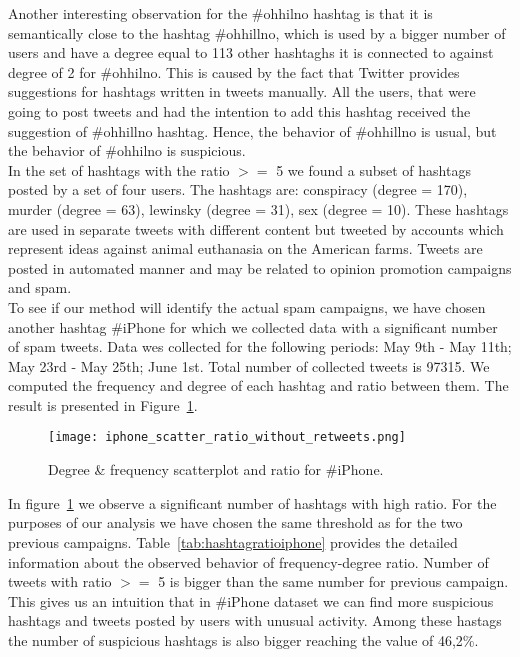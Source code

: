 \documentclass[journal, a4paper, 12pt]{article}
\begin{document}
Another interesting observation for the \#ohhilno hashtag is that it is semantically close to the hashtag \#ohhillno, which is used by a bigger number of users and have a degree equal to 113 other hashtaghs it is connected to against degree of 2 for \#ohhilno. This is caused by the fact that Twitter provides suggestions for hashtags written in tweets manually. All the users, that were going to post tweets and had the intention to add this hashtag received the suggestion of \#ohhillno hashtag. Hence, the behavior of \#ohhillno is usual, but the behavior of \#ohhilno is suspicious. \\

In the set of hashtags with the ratio $>=$ 5 we found a subset of hashtags posted by a set of four users. The hashtags are: conspiracy (degree = 170), murder (degree = 63), lewinsky (degree = 31), sex (degree = 10). These hashtags are used in separate tweets with different content but tweeted by accounts which represent ideas against animal euthanasia on the American farms. Tweets are posted in automated manner and may be related to opinion promotion campaigns and spam. \\


To see if our method will identify the actual spam campaigns, we have chosen another hashtag \#iPhone for which we collected data with a significant number of spam tweets. Data wes collected for the following periods: May 9th - May 11th; May 23rd - May 25th; June 1st. Total number of collected tweets is 97315. We computed the frequency and degree of each hashtag and ratio between them. The result is presented in Figure~\ref{fig:scatter_ratio_iphone}.
\\
        \begin{figure}[!hbt]
		\begin{center}
		\texttt{[image: iphone\_scatter\_ratio\_without\_retweets.png]}
		\caption{Degree \& frequency scatterplot and ratio for \#iPhone.}
		\label{fig:scatter_ratio_iphone}
		\end{center}
	\end{figure}
    
In figure~\ref{fig:scatter_ratio_iphone} we observe a significant number of hashtags with high ratio. For the purposes of our analysis we have chosen the same threshold as for the two previous campaigns. Table~\ref{tab:hashtagratioiphone} provides the detailed information about the observed behavior of frequency-degree ratio. Number of tweets with ratio $>=$ 5 is bigger than the same number for previous campaign. This gives us an intuition that in \#iPhone dataset we can find more suspicious hashtags and tweets posted by users with unusual activity. Among these hastags the number of suspicious hashtags is also bigger reaching the value of 46,2\%.
\\
    
\end{document}
